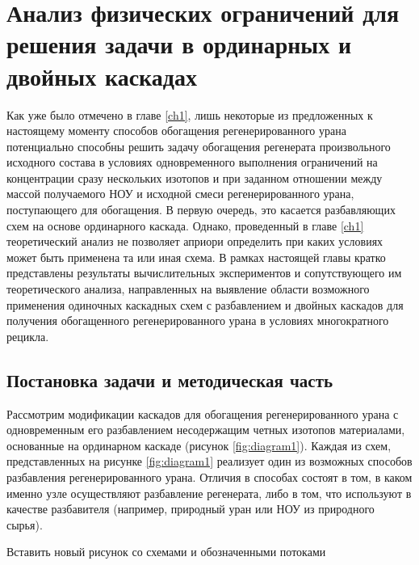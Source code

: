 \chapter{Анализ физических ограничений для решения задачи в ординарных и двойных каскадах}\label{ch:ch2}

Как уже было отмечено в главе \ref{ch1}, лишь некоторые из предложенных к настоящему моменту способов обогащения регенерированного урана потенциально способны решить задачу обогащения регенерата произвольного исходного состава в условиях одновременного выполнения ограничений на концентрации сразу нескольких изотопов и при заданном отношении между массой получаемого НОУ и исходной смеси регенерированного урана, поступающего для обогащения. В первую очередь, это касается разбавляющих схем на основе ординарного каскада. 
Однако, проведенный в главе \ref{ch1} теоретический анализ не позволяет априори определить при каких условиях может быть применена та или иная схема. В рамках настоящей главы кратко представлены результаты вычислительных экспериментов и сопутствующего им теоретического анализа, направленных на выявление области возможного применения одиночных каскадных схем с разбавлением и двойных каскадов для получения обогащенного регенерированного урана в условиях многократного рецикла. 

\section{Постановка задачи и методическая часть}\label{ch2_stat}

Рассмотрим модификации каскадов для обогащения регенерированного урана с одновременным его разбавлением несодержащим четных изотопов материалами, основанные на ординарном каскаде (рисунок \ref{fig:diagram1}). Каждая из схем, представленных на рисунке \ref{fig:diagram1} реализует один из возможных способов разбавления регенерированного урана. Отличия в способах состоят в том, в каком именно узле осуществляют разбавление регенерата, либо в том, что используют в качестве разбавителя (например, природный уран или НОУ из природного сырья).


Вставить новый рисунок со схемами и обозначенными потоками 



